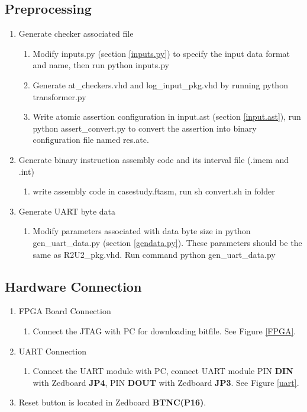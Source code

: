 \documentclass{article}
\theoremstyle{definition}
\begin{document}
\subsection{Preprocessing}
\begin{enumerate}
\item Generate checker associated file
	\begin{enumerate}
		\item Modify \textcolor{green!100}{inputs.py} (section \ref{inputs.py}) to specify the input data format and name, then run \colorbox{blue!30}{python inputs.py }
		\item Generate \textcolor{purple!30}{at\_checkers.vhd} and \textcolor{purple!30}{log\_input\_pkg.vhd} by running \colorbox{blue!30}{python transformer.py}
		\item Write atomic assertion configuration in \textcolor{green!100}{input.ast} (section \ref{input.ast}), run \colorbox{blue!30}{python assert\_convert.py} to convert the assertion into binary configuration file named \textcolor{purple!30}{res.atc}.
	\end{enumerate}
\item Generate binary instruction assembly code and its interval file (.imem and .int)
	\begin{enumerate}
		\item write assembly code in \textcolor{green!100}{casestudy.ftasm}, run \colorbox{blue!30}{sh convert.sh} in folder
	\end{enumerate}
\item Generate UART byte data
	\begin{enumerate}
		\item Modify parameters associated with data byte size in \textcolor{green!100}{python gen\_uart\_data.py} (section \ref{gendata.py}). These parameters should be the same as \textcolor{purple!30}{R2U2\_pkg.vhd}. Run command \colorbox{blue!30}{python gen\_uart\_data.py}
	\end{enumerate}	
\end{enumerate}

\subsection{Hardware Connection}
\begin{enumerate}
	\item FPGA Board Connection
	\begin{enumerate}
		\item Connect the JTAG with PC for downloading bitfile. See Figure \ref{FPGA}.
	\end{enumerate}
	\item UART Connection
	\begin{enumerate}
		\item Connect the UART module with PC, connect UART module PIN \textbf{DIN} with Zedboard \textbf{JP4}, PIN \textbf{DOUT} with Zedboard \textbf{JP3}. See Figure \ref{uart}.
	\end{enumerate}
	\item Reset button is located in Zedboard  \textbf{BTNC(P16)}.
\end{enumerate}
\end{document}
